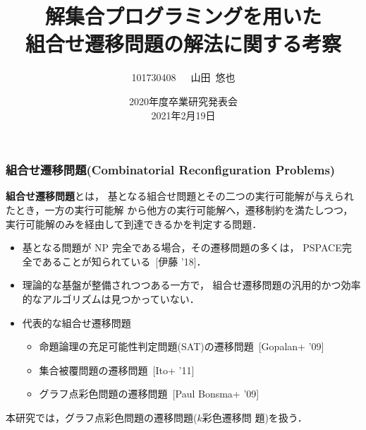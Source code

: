 \documentclass[dvipdfmx,11pt]{beamer}
\title[ASPを用いた組合せ遷移問題の解法に関する考察]{解集合プログラミングを用いた\\組合せ遷移問題の解法に関する考察}
\author{101730408~~~山田~悠也}
\date{2020年度卒業研究発表会\\2021年2月19日}
\institute{番原研究室}
\begin{document}
\begin{frame}\frametitle{}
  \titlepage
\end{frame}

\begin{frame}\frametitle{組合せ遷移問題(Combinatorial Reconfiguration Problems)}

  \begin{alertblock}{}
    \alert{\bf 組合せ遷移問題}とは，
    基となる組合せ問題とその二つの実行可能解が与えられたとき，一方の実行可能解
    から他方の実行可能解へ，遷移制約を満たしつつ，
    実行可能解のみを経由して到達できるかを判定する問題．
  \end{alertblock}

  \begin{itemize}
    \item 基となる問題が NP 完全である場合，その遷移問題の多くは，
      \alert{PSPACE完全}であることが知られている~[伊藤 '18]．
    \item 理論的な基盤が整備されつつある一方で，
      組合せ遷移問題の\alert{汎用的かつ効率的なアルゴリズムは見つかっていない}．
    \item 代表的な組合せ遷移問題
      \begin{itemize}
      \item 命題論理の充足可能性判定問題(SAT)の遷移問題~[Gopalan+ '09]
      \item 集合被覆問題の遷移問題~[Ito+ '11]
      \item グラフ点彩色問題の遷移問題~[Paul Bonsma+ '09]
      \end{itemize}
  \end{itemize}
  \begin{alertblock}{}\centering
    本研究では，グラフ点彩色問題の遷移問題(\alert{$k$彩色遷移問
      題})を扱う．
  \end{alertblock}

  
\end{frame}
\end{document}
